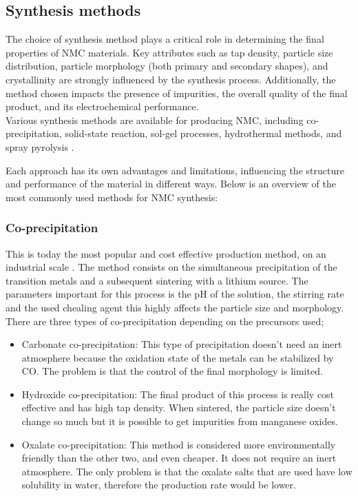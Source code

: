 \documentclass{article}
\begin{document}
\subsection{Synthesis methods}
The choice of synthesis method plays a critical role in determining the final properties of NMC materials. Key attributes such as tap density, particle size distribution, particle morphology (both primary and secondary shapes), and crystallinity are strongly influenced by the synthesis process. Additionally, the method chosen impacts the presence of impurities, the overall quality of the final product, and its electrochemical performance. \\

Various synthesis methods are available for producing NMC, including co-precipitation, solid-state reaction, sol-gel processes, hydrothermal methods, and spray pyrolysis \cite{process}. 

Each approach has its own advantages and limitations, influencing the structure and performance of the material in different ways. Below is an overview of the most commonly used methods for NMC synthesis:
\subsubsection{Co-precipitation}
This is today the most popular and cost effective production method, on an industrial scale
. The method consists on the simultaneous precipitation of the transition metals and a subsequent sintering with
a lithium source. The parameters important for this process is the pH of the solution, the stirring rate 
and the used chealing agent this highly affects the particle size and morphology\cite{process}.\\
There are three types of co-precipitation depending on the precursors used;
\begin{itemize}
  \item Carbonate co-precipitation: This type of precipitation doesn't need an inert atmosphere
  because the oxidation state of the metals can be stabilized by CO. The problem is that
the control of the final morphology is limited.
  \item Hydroxide co-precipitation: The final product of this process is really
  cost effective and has high tap density. When sintered, the particle size doesn't change
  so much but it is possible to get impurities from manganese oxides.
  \item Oxalate co-precipitation: This method is considered more environmentally
  friendly than the other two, and even cheaper. It does not require an inert 
  atmosphere. The only problem is that the oxalate salts that are used 
  have low solubility in water, therefore the production rate would be lower\cite{process}.
\end{itemize}
\end{document}
